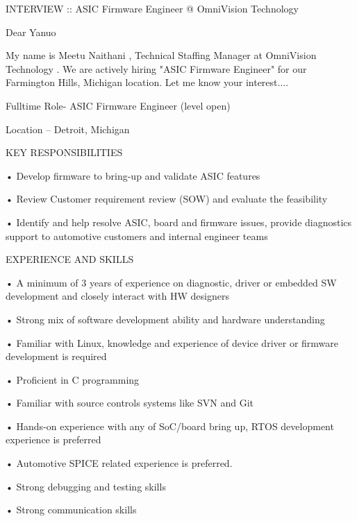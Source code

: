 \par INTERVIEW :: ASIC Firmware Engineer @ OmniVision Technology
\par Dear Yanuo
\par My name is Meetu Naithani , Technical Staffing Manager at OmniVision Technology . We are actively hiring "ASIC Firmware Engineer" for our Farmington Hills, Michigan location. Let me know your interest....
\par 
\par Fulltime Role- ASIC Firmware Engineer (level open)
\par Location – Detroit, Michigan
\par KEY RESPONSIBILITIES
\par • Develop firmware to bring-up and validate ASIC features
\par • Review Customer requirement review (SOW) and evaluate the feasibility
\par • Identify and help resolve ASIC, board and firmware issues, provide diagnostics support to automotive customers and internal engineer teams
\par 
\par EXPERIENCE AND SKILLS
\par • A minimum of 3 years of experience on diagnostic, driver or embedded SW development and closely interact with HW designers
\par • Strong mix of software development ability and hardware understanding
\par • Familiar with Linux, knowledge and experience of device driver or firmware development is required
\par • Proficient in C programming
\par • Familiar with source controls systems like SVN and Git
\par • Hands-on experience with any of SoC/board bring up, RTOS development experience is preferred
\par • Automotive SPICE related experience is preferred.
\par • Strong debugging and testing skills
\par • Strong communication skills
\vfil
\bye
